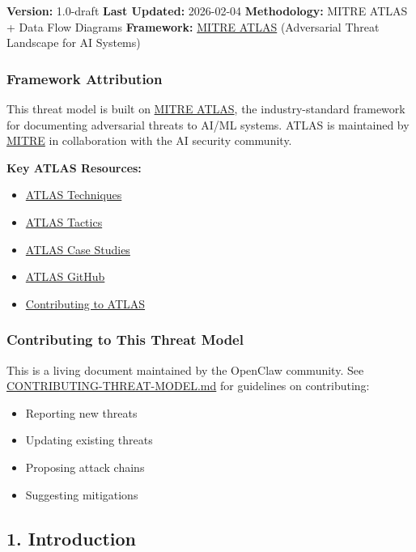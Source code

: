 \textbf{Version:} 1.0-draft
\textbf{Last Updated:} 2026-02-04
\textbf{Methodology:} MITRE ATLAS + Data Flow Diagrams
\textbf{Framework:} \href{https://atlas.mitre.org/}{MITRE ATLAS} (Adversarial Threat Landscape for AI Systems)

\subsubsection{Framework Attribution}


This threat model is built on \href{https://atlas.mitre.org/}{MITRE ATLAS}, the industry-standard framework for documenting adversarial threats to AI/ML systems. ATLAS is maintained by \href{https://www.mitre.org/}{MITRE} in collaboration with the AI security community.

\textbf{Key ATLAS Resources:}

\begin{itemize}
  \item \href{https://atlas.mitre.org/techniques/}{ATLAS Techniques}
  \item \href{https://atlas.mitre.org/tactics/}{ATLAS Tactics}
  \item \href{https://atlas.mitre.org/studies/}{ATLAS Case Studies}
  \item \href{https://github.com/mitre-atlas/atlas-data}{ATLAS GitHub}
  \item \href{https://atlas.mitre.org/resources/contribute}{Contributing to ATLAS}
\end{itemize}


\subsubsection{Contributing to This Threat Model}


This is a living document maintained by the OpenClaw community. See \href{./CONTRIBUTING-THREAT-MODEL.md}{CONTRIBUTING-THREAT-MODEL.md} for guidelines on contributing:

\begin{itemize}
  \item Reporting new threats
  \item Updating existing threats
  \item Proposing attack chains
  \item Suggesting mitigations
\end{itemize}


\hrulefill


\subsection{1. Introduction}


